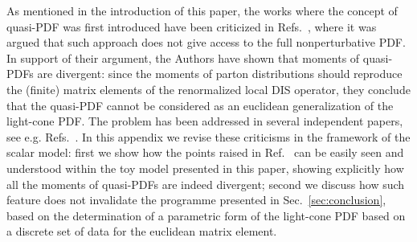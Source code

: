 As mentioned in the introduction of this paper, the works where the concept of
quasi-PDF was first introduced have been criticized in
Refs.~\cite{Rossi:2017muf, Rossi:2018zkn}, where it was argued that such
approach does not give access to the full nonperturbative PDF. In support of
their argument, the Authors have shown that moments of quasi-PDFs are divergent:
since the moments of parton distributions should reproduce the (finite) matrix
elements of the renormalized local DIS operator, they conclude that the
quasi-PDF cannot be considered as an euclidean generalization of the light-cone
PDF. The problem has been addressed in several independent papers, see e.g.
Refs.~\cite{Ji:2017rah, Radyushkin:2018nbf, Karpie:2018zaz}. In this appendix we
revise these criticisms in the framework of the scalar model: first we show how
the points raised in Ref.~\cite{Rossi:2017muf, Rossi:2018zkn} can be easily seen
and understood within the toy model presented in this paper, showing explicitly
how all the moments of quasi-PDFs are indeed divergent; second we discuss how
such feature does not invalidate the programme presented in
Sec.~\ref{sec:conclusion}, based on the determination of a parametric form of
the light-cone PDF based on a discrete set of data for the euclidean matrix
element.

